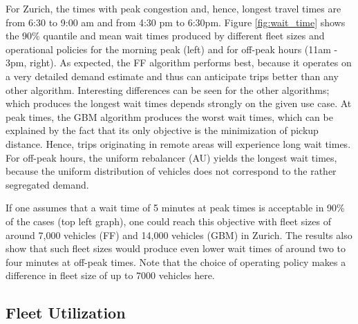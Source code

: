For Zurich, the times with peak congestion and, hence, longest travel times are from 6:30 to 9:00 am and from 4:30 pm to 6:30pm. Figure \ref{fig:wait_time} shows the 90\% quantile and mean wait times produced by different fleet sizes and operational policies for the morning peak (left) and for off-peak hours (11am - 3pm, right). As expected, the FF algorithm performs best, because it operates on a very detailed demand estimate and thus can anticipate trips better than any other algorithm. Interesting differences can be seen for the other algorithms; which produces the longest wait times depends strongly on the given use case. At peak times, the GBM algorithm produces the worst wait times, which can be explained by the fact that its only objective is the minimization of pickup distance. Hence, trips originating in remote areas will experience long wait times. For off-peak hours, the uniform rebalancer (AU) yields the longest wait times, because the uniform distribution of vehicles does not correspond to the rather segregated demand.
 

If one assumes that a wait time of 5 minutes at peak times is acceptable in 90\% of the cases (top left graph), one could reach this objective with fleet sizes of around 7,000 vehicles (FF) and 14,000 vehicles (GBM) in Zurich. The results also show that such fleet sizes would produce even lower wait times of around two to four minutes at off-peak times. Note that the choice of operating policy makes a difference in fleet size of up to 7000 vehicles here.


\subsection{Fleet Utilization}
\label{sec:cost_analysis}


